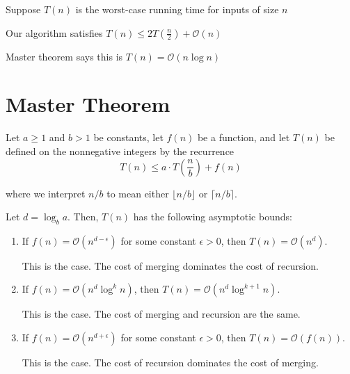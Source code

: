 \begin{listu}
    \item Suppose $T(n)$ is the worst-case running time for inputs of size $n$
    \item Our algorithm satisfies $T(n) \le 2T(\frac{n}{2}) + \mathcal{O}(n)$
    \item Master theorem says this is $T(n) = \mathcal{O}(n \log n)$
\end{listu}

\section{Master Theorem}

\begin{theorem}
    Let $a \ge 1$ and $b > 1$ be constants, let $f(n)$ be a function, and let $T(n)$ be defined on the nonnegative integers by the recurrence \[
        T(n) \le a \cdot T\left( \frac{n}{b} \right) + f(n)
    \]

    where we interpret $n/b$ to mean either $\lfloor n/b \rfloor$ or $\lceil n/b \rceil$. 
    
    Let $d = \log_b a$. Then, $T(n)$ has the following asymptotic bounds:
    \begin{enumerate}
        \item If $f(n) = \mathcal{O}(n^{d - \epsilon})$ for some constant $\epsilon > 0$, then $T(n) = \mathcal{O}(n^d)$.

        This is the  case. The cost of merging dominates the cost of recursion.

        \item If $f(n) = \mathcal{O}(n^d \log^k n)$, then $T(n) = \mathcal{O}(n^d \log^{k+1} n)$.

        This is the  case. The cost of merging and recursion are the same.

        \item If $f(n) = \mathcal{O}(n^{d + \epsilon})$ for some constant $\epsilon > 0$, then $T(n) = \mathcal{O}(f(n))$.

        This is the  case. The cost of recursion dominates the cost of merging.
    \end{enumerate}
\end{theorem}

